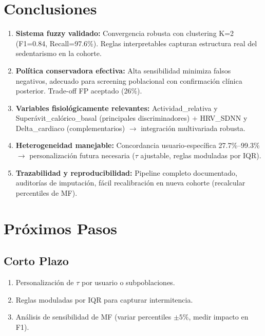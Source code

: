 \documentclass[12pt,a4paper,twoside]{article}
\begin{document}

\section{Conclusiones}

\begin{enumerate}
    \item \textbf{Sistema fuzzy validado:} Convergencia robusta con clustering K=2 (F1=0.84, Recall=97.6\%). Reglas interpretables capturan estructura real del sedentarismo en la cohorte.
    
    \item \textbf{Política conservadora efectiva:} Alta sensibilidad minimiza falsos negativos, adecuado para screening poblacional con confirmación clínica posterior. Trade-off FP aceptado (26\%).
    
    \item \textbf{Variables fisiológicamente relevantes:} Actividad\_relativa y Superávit\_calórico\_basal (principales discriminadores) + HRV\_SDNN y Delta\_cardiaco (complementarios) $\rightarrow$ integración multivariada robusta.
    
    \item \textbf{Heterogeneidad manejable:} Concordancia usuario-específica 27.7\%--99.3\% $\rightarrow$ personalización futura necesaria ($\tau$ ajustable, reglas moduladas por IQR).
    
    \item \textbf{Trazabilidad y reproducibilidad:} Pipeline completo documentado, auditorías de imputación, fácil recalibración en nueva cohorte (recalcular percentiles de MF).
\end{enumerate}


\section{Próximos Pasos}

\subsection{Corto Plazo}
\begin{enumerate}
    \item Personalización de $\tau$ por usuario o subpoblaciones.
    \item Reglas moduladas por IQR para capturar intermitencia.
    \item Análisis de sensibilidad de MF (variar percentiles $\pm 5\%$, medir impacto en F1).
\end{enumerate}
\end{document}
